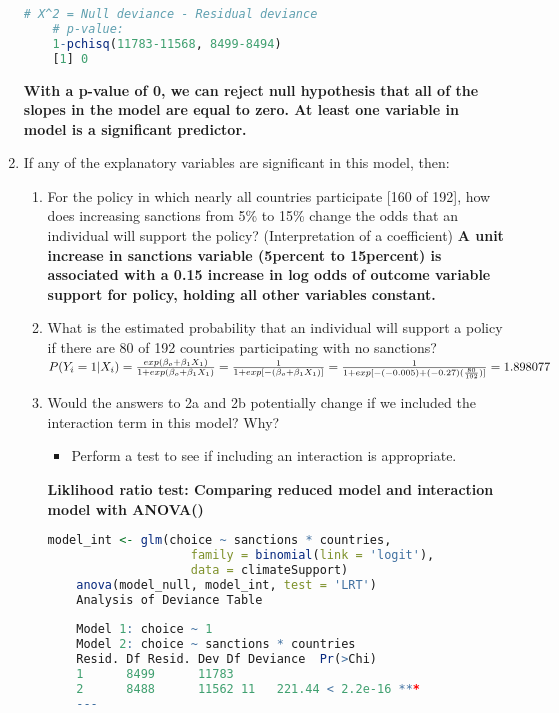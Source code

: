 \documentclass[12pt,letterpaper]{article}
\begin{document}
\begin{enumerate}
\begin{lstlisting}[language= R]
	# X^2 = Null deviance - Residual deviance
	# p-value:
	1-pchisq(11783-11568, 8499-8494)
	[1] 0
\end{lstlisting}
\textbf{With a p-value of 0, we can reject null hypothesis that all of the slopes in the model are equal to zero. At least one variable in model is a significant predictor.}
	\item
	If any of the explanatory variables are significant in this model, then:
	\begin{enumerate}
		\item
		For the policy in which nearly all countries participate [160 of 192], how does increasing sanctions from 5\% to 15\% change the odds that an individual will support the policy? (Interpretation of a coefficient)
		\newline\textbf{A unit increase in sanctions variable (5percent to 15percent) is associated with a 0.15  increase in log odds of outcome variable support for policy, holding all other variables constant.}
		\item
		What is the estimated probability that an individual will support a policy if there are 80 of 192 countries participating with no sanctions? 
		\newline$P(Y_i = 1|X_i) = \frac{exp(\beta_o + \beta_1 X_1)}{1 + exp(\beta_o + \beta_1 X_1)} = \frac{1}{1 + exp[-(\beta_o + \beta_1 X_1)]} = \frac{1}{1 + exp[-(-0.005) + (-0.27)(\frac{80}{192})]}
		\newline = 1.898077
		$
		\item
		Would the answers to 2a and 2b potentially change if we included the interaction term in this model? Why? 
		\begin{itemize}
			\item Perform a test to see if including an interaction is appropriate.
		\end{itemize}
	\textbf{Liklihood ratio test: Comparing reduced model and interaction model with ANOVA()}
	\begin{lstlisting}[language= R]
	model_int <- glm(choice ~ sanctions * countries, 
	                family = binomial(link = 'logit'), 
	                data = climateSupport)
	anova(model_null, model_int, test = 'LRT')
	Analysis of Deviance Table
	
	Model 1: choice ~ 1
	Model 2: choice ~ sanctions * countries
	Resid. Df Resid. Dev Df Deviance  Pr(>Chi)    
	1      8499      11783                          
	2      8488      11562 11   221.44 < 2.2e-16 ***
	---
	\end{lstlisting}
	\end{enumerate}
\end{enumerate}
\end{document}
